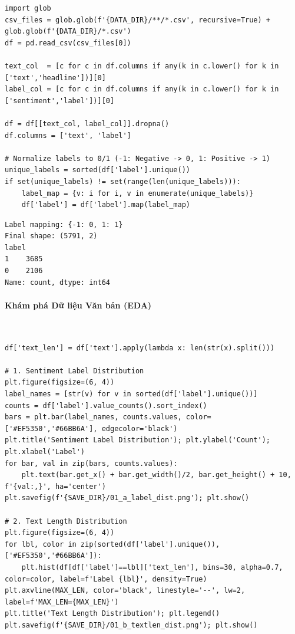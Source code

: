 \begin{lstlisting}[style=pythoncode, caption={Đọc tập dữ liệu Stock Data từ file CSV}]
import glob
csv_files = glob.glob(f'{DATA_DIR}/**/*.csv', recursive=True) + glob.glob(f'{DATA_DIR}/*.csv')
df = pd.read_csv(csv_files[0])

text_col  = [c for c in df.columns if any(k in c.lower() for k in ['text','headline'])][0]
label_col = [c for c in df.columns if any(k in c.lower() for k in ['sentiment','label'])][0]

df = df[[text_col, label_col]].dropna()
df.columns = ['text', 'label']

# Normalize labels to 0/1 (-1: Negative -> 0, 1: Positive -> 1)
unique_labels = sorted(df['label'].unique())
if set(unique_labels) != set(range(len(unique_labels))):
    label_map = {v: i for i, v in enumerate(unique_labels)}
    df['label'] = df['label'].map(label_map)
\end{lstlisting}

\begin{lstlisting}[style=consoleoutput, caption={Output: Kích thước và thông tin bộ dữ liệu ban đầu}]
Label mapping: {-1: 0, 1: 1}
Final shape: (5791, 2)
label
1    3685
0    2106
Name: count, dtype: int64
\end{lstlisting}

\paragraph{Khám phá Dữ liệu Văn bản (EDA)} \hfill \\

\begin{lstlisting}[style=pythoncode, caption={Trực quan hóa phân phối độ dài văn bản và Nhãn cảm xúc}]
df['text_len'] = df['text'].apply(lambda x: len(str(x).split()))

# 1. Sentiment Label Distribution
plt.figure(figsize=(6, 4))
label_names = [str(v) for v in sorted(df['label'].unique())]
counts = df['label'].value_counts().sort_index()
bars = plt.bar(label_names, counts.values, color=['#EF5350','#66BB6A'], edgecolor='black')
plt.title('Sentiment Label Distribution'); plt.ylabel('Count'); plt.xlabel('Label')
for bar, val in zip(bars, counts.values):
    plt.text(bar.get_x() + bar.get_width()/2, bar.get_height() + 10, f'{val:,}', ha='center')
plt.savefig(f'{SAVE_DIR}/01_a_label_dist.png'); plt.show()

# 2. Text Length Distribution
plt.figure(figsize=(6, 4))
for lbl, color in zip(sorted(df['label'].unique()), ['#EF5350','#66BB6A']):
    plt.hist(df[df['label']==lbl]['text_len'], bins=30, alpha=0.7, color=color, label=f'Label {lbl}', density=True)
plt.axvline(MAX_LEN, color='black', linestyle='--', lw=2, label=f'MAX_LEN={MAX_LEN}')
plt.title('Text Length Distribution'); plt.legend()
plt.savefig(f'{SAVE_DIR}/01_b_textlen_dist.png'); plt.show()
\end{lstlisting}

